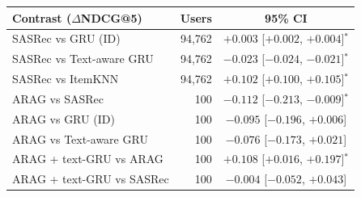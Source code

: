 \begin{tabular}{lrc}
\toprule
Contrast ($\Delta$NDCG@5) & Users & 95\% CI \\
\midrule
SASRec vs GRU (ID) & 94{,}762 & $+0.003$ [$+0.002$, $+0.004$]$^{*}$ \\
SASRec vs Text-aware GRU & 94{,}762 & $-0.023$ [$-0.024$, $-0.021$]$^{*}$ \\
SASRec vs ItemKNN & 94{,}762 & $+0.102$ [$+0.100$, $+0.105$]$^{*}$ \\
ARAG vs SASRec & 100 & $-0.112$ [$-0.213$, $-0.009$]$^{*}$ \\
ARAG vs GRU (ID) & 100 & $-0.095$ [$-0.196$, $+0.006$] \\
ARAG vs Text-aware GRU & 100 & $-0.076$ [$-0.173$, $+0.021$] \\
ARAG + text-GRU vs ARAG & 100 & $+0.108$ [$+0.016$, $+0.197$]$^{*}$ \\
ARAG + text-GRU vs SASRec & 100 & $-0.004$ [$-0.052$, $+0.043$] \\
\bottomrule
\end{tabular}
